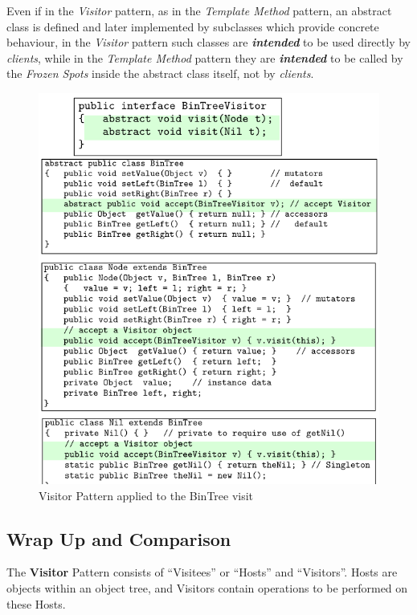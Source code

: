 Even if in the \textit{Visitor} pattern, as in the \textit{Template Method} pattern, an abstract class is defined and later implemented by subclasses which provide concrete behaviour,
in the \textit{Visitor} pattern such classes are \textit{\textbf{intended}} to be used directly by \textit{clients},
while in the \textit{Template Method} pattern they are \textit{\textbf{intended}} to be called by the \textit{Frozen Spots} inside the abstract class itself, not by \textit{clients}.

\begin{figure}[htbp]
   \centering
   \includegraphics{images/visitorpattern_treecode.png}
   \caption{Visitor Pattern applied to the BinTree visit}
   \label{fig:visitorpattern_treecode}
\end{figure}
\subsection{Wrap Up and Comparison}

The \textbf{Visitor} Pattern
consists of ``Visitees'' or ``Hosts'' and ``Visitors''. Hosts are objects within an object tree, and Visitors contain operations to be performed on these Hosts.

